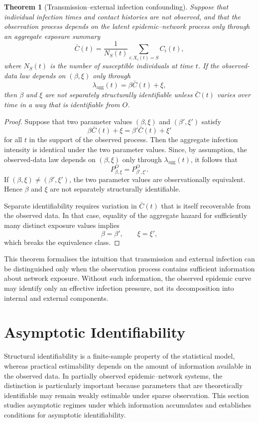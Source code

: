 \documentclass[10pt]{article}
\newtheorem{theorem}{Theorem}
\begin{document}
\begin{theorem}[Transmission--external infection confounding]
Suppose that individual infection times and contact histories are not observed, and that the observation process depends on the latent epidemic--network process only through an aggregate exposure summary
\[
\bar C(t)
=
\frac{1}{N_S(t)}
\sum_{i:X_i(t)=S}
C_i(t),
\]
where $N_S(t)$ is the number of susceptible individuals at time $t$. If the observed-data law depends on $(\beta,\xi)$ only through
\[
\lambda_{\mathrm{agg}}(t)
=
\beta \bar C(t)+\xi,
\]
then $\beta$ and $\xi$ are not separately structurally identifiable unless $\bar C(t)$ varies over time in a way that is identifiable from $O$.
\end{theorem}

\begin{proof}
Suppose that two parameter values $(\beta,\xi)$ and $(\beta',\xi')$ satisfy
\[
\beta \bar C(t)+\xi
=
\beta'\bar C(t)+\xi'
\]
for all $t$ in the support of the observed process. Then the aggregate infection intensity is identical under the two parameter values. Since, by assumption, the observed-data law depends on $(\beta,\xi)$ only through $\lambda_{\mathrm{agg}}(t)$, it follows that
\[
P_{\beta,\xi}^O
=
P_{\beta',\xi'}^O .
\]
If $(\beta,\xi)\neq(\beta',\xi')$, the two parameter values are observationally equivalent. Hence $\beta$ and $\xi$ are not separately structurally identifiable.

Separate identifiability requires variation in $\bar C(t)$ that is itself recoverable from the observed data. In that case, equality of the aggregate hazard for sufficiently many distinct exposure values implies
\[
\beta=\beta',
\qquad
\xi=\xi',
\]
which breaks the equivalence class.
\end{proof}

This theorem formalises the intuition that transmission and external infection can be distinguished only when the observation process contains sufficient information about network exposure. Without such information, the observed epidemic curve may identify only an effective infection pressure, not its decomposition into internal and external components.

\section{Asymptotic Identifiability}
\label{sec6:asymp}
Structural identifiability is a finite-sample property of the statistical model, whereas practical estimability depends on the amount of information available in the observed data. In partially observed epidemic--network systems, the distinction is particularly important because parameters that are theoretically identifiable may remain weakly estimable under sparse observation. This section studies asymptotic regimes under which information accumulates and establishes conditions for asymptotic identifiability.
\end{document}

